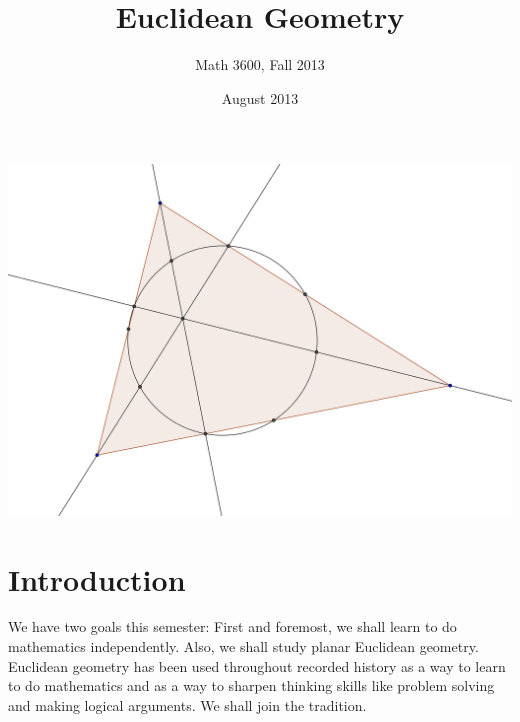 \documentclass{tufte-handout}
\title{Euclidean Geometry}
\author[Math 3600]{Math 3600, Fall 2013}
\date{August 2013}
\theoremstyle{definition}
\begin{document}
\maketitle

\begin{marginfigure}
    \includegraphics{NPC}
\end{marginfigure}


\section*{Introduction}

We have two goals this semester: 
First and foremost, we shall learn to do mathematics independently. 
Also, we shall study planar Euclidean geometry. 
Euclidean geometry has been used throughout recorded history as a way to learn to do mathematics and as a way to sharpen thinking skills like problem solving and making logical arguments. 
We shall join the tradition.
\end{document}

